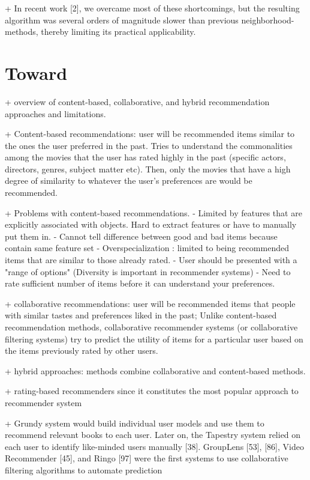 + In recent work [2], we overcame most of these shortcomings,
but the resulting algorithm was several orders
of magnitude slower than previous neighborhood-methods,
thereby limiting its practical applicability.

\section{Toward}
\cite{toward}
\citeyear{toward}

+ overview of content-based, collaborative, and hybrid recommendation approaches and limitations. 

+ Content-based recommendations: user will be recommended items similar to the ones the user preferred in the past. Tries to understand the commonalities among the movies that the user has rated highly in the past (specific actors, directors, genres, subject matter etc). Then, only the movies that have a high degree of similarity to whatever the user's preferences are would be recommended. 

+ Problems with content-based recommendations.
    - Limited by features that are explicitly associated with objects. Hard to extract features or have to manually put them in.
    - Cannot tell difference between good and bad items because contain same feature set
    - Overspecialization : limited to being recommended items that are similar to those already rated. 
    - User should be presented with a "range of options" (Diversity is important in recommender systems) 
    - Need to rate sufficient number of items before it can understand your preferences. 

+ collaborative recommendations: user will be recommended items that people with similar tastes and preferences liked in the past; Unlike content-based recommendation methods, collaborative recommender systems (or collaborative filtering systems) try to predict the utility of items for a particular user based on the items previously rated by other users.

+ hybrid approaches: methods combine collaborative and content-based methods. 

+ rating-based recommenders since it constitutes the most popular approach to recommender system


+ Grundy system would build individual user models
and use them to recommend relevant books to each user.
Later on, the Tapestry system relied on each user to
identify like-minded users manually [38]. GroupLens [53],
[86], Video Recommender [45], and Ringo [97] were the
first systems to use collaborative filtering algorithms to
automate prediction

